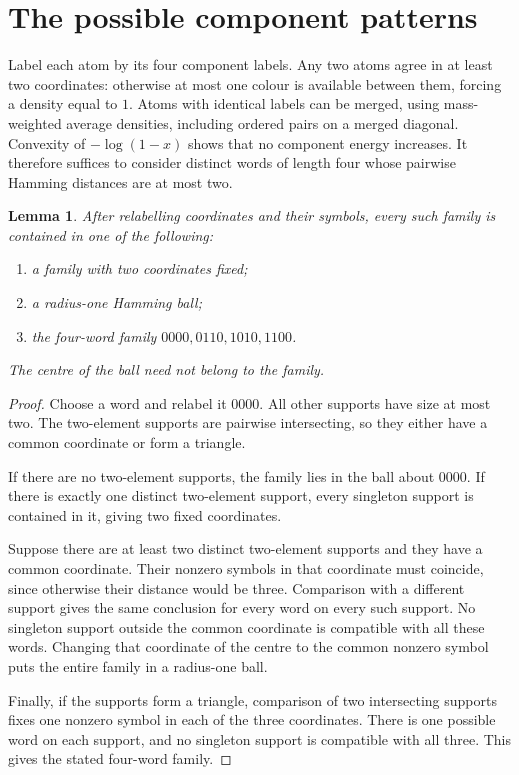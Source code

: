 \documentclass[11pt]{article}
\newtheorem{lemma}[theorem]{Lemma}
\begin{document}
\section{The possible component patterns}

Label each atom by its four component labels. Any two atoms agree in at least
two coordinates: otherwise at most one colour is available between them,
forcing a density equal to $1$. Atoms with identical labels can be merged,
using mass-weighted average densities, including ordered pairs on a merged
diagonal. Convexity of $-\log(1-x)$ shows that no component energy increases.
It therefore suffices to consider distinct words of length four whose pairwise
Hamming distances are at most two.

\begin{lemma}\label{lem:patterns}
After relabelling coordinates and their symbols, every such family is
contained in one of the following:
\begin{enumerate}
\item a family with two coordinates fixed;
\item a radius-one Hamming ball;
\item the four-word family $0000,0110,1010,1100$.
\end{enumerate}
The centre of the ball need not belong to the family.
\end{lemma}
\begin{proof}
Choose a word and relabel it $0000$. All other supports have size at most
two. The two-element supports are pairwise intersecting, so they either have
a common coordinate or form a triangle.

If there are no two-element supports, the family lies in the ball about
$0000$. If there is exactly one distinct two-element support, every singleton
support is contained in it, giving two fixed coordinates.

Suppose there are at least two distinct two-element supports and they have
a common coordinate. Their nonzero symbols in that coordinate must coincide,
since otherwise their distance would be three. Comparison with a different
support gives the same conclusion for every word on every such support.
No singleton support outside the common coordinate is compatible with all
these words. Changing that coordinate of the centre to the common nonzero
symbol puts the entire family in a radius-one ball.

Finally, if the supports form a triangle, comparison of two intersecting
supports fixes one nonzero symbol in each of the three coordinates.
There is one possible word on each support, and no singleton support is
compatible with all three. This gives the stated four-word family.
\end{proof}
\end{document}
